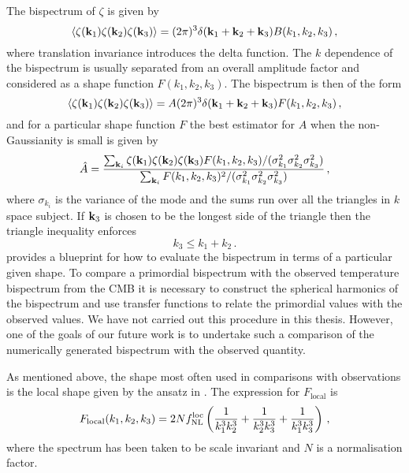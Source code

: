 The bispectrum of $\zeta$ is given by
% 
\begin{equation}
 \langle \zeta(\textbf{k}_1)\zeta(\textbf{k}_2)\zeta(\textbf{k}_3)\rangle = 
        (2\pi)^3 \delta(\textbf{k}_1+\textbf{k}_2+\textbf{k}_3) B(k_1,k_2,k_3)\,,
\end{equation}
% 
where translation invariance introduces the delta function. The $k$ dependence of the bispectrum 
is usually separated from an overall amplitude factor and considered as a shape function
$F(k_1,k_2,k_3)$. The bispectrum is then of the form \cite{Liguori:2010hx, Babich:2004gb}
% 
\begin{equation}
 \langle \zeta(\textbf{k}_1)\zeta(\textbf{k}_2)\zeta(\textbf{k}_3)\rangle = 
        A (2\pi)^3 \delta(\textbf{k}_1 + \textbf{k}_2 + \textbf{k}_3) F(k_1,k_2,k_3)\,,
\end{equation}
% 
and for a particular shape function $F$ the best estimator for $A$ when the non-Gaussianity is
small is given by \cite{Babich:2004gb}
% 
\begin{equation}
\label{eq:fnlampl-perts}
\hat{A} = \frac{\sum_{\textbf{k}_i} \zeta(\textbf{k}_1)\zeta(\textbf{k}_2)\zeta(\textbf{k}_3) F(k_1,k_2,k_3)/ 
                (\sigma^2_{k_1}\sigma^2_{k_2}\sigma^2_{k_3}) }
                {\sum_{\textbf{k}_i} F(k_1,k_2,k_3)^2/(\sigma^2_{k_1}\sigma^2_{k_2}\sigma^2_{k_3})} \,,
\end{equation}
% 
where $\sigma_{k_i}$ is the variance of the mode and the sums run over all the triangles in $k$
space subject. If $\textbf{k}_3$ is chosen to be the longest side of the triangle then the triangle
inequality enforces
% 
\begin{equation}
 k_3 \le k_1 + k_2\,.
\end{equation}
% 
 provides a blueprint for how to evaluate the bispectrum in terms of a
particular given shape. To compare a primordial bispectrum with the observed temperature bispectrum
from the CMB it is necessary to construct the spherical harmonics of the bispectrum and use
transfer functions to relate the primordial values with the observed values. We have not
carried out this procedure in this thesis. However, one of the goals of our future work is to
undertake such a comparison of the numerically generated bispectrum with the observed quantity. 

As mentioned above, the shape most often used in comparisons with observations is the local shape
given by the
ansatz in . The expression for $F_\mathrm{local}$ is
\cite{Babich:2004gb, Komatsu:2010fb}
% 
\begin{equation}
 F_\mathrm{local}(k_1,k_2,k_3) = 2Nf_{\mathrm{NL}}^\mathrm{loc} \left(\frac{1}{k_1^3 k_2^3}
                                  +\frac{1}{k_2^3 k_3^3} + \frac{1}{k_1^3 k_3^3}\right) \,,
\end{equation}
% 
where the spectrum has been taken to be scale invariant and $N$ is a normalisation factor. 

